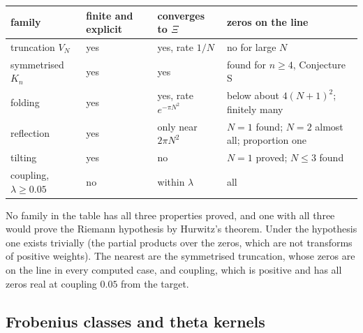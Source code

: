 \begin{center}
\small
\begin{tabular}{p{2.3cm}p{1.9cm}p{2.7cm}p{3.5cm}}
\hline
family & finite and explicit & converges to $\Xi$ & zeros on the line\\
\hline
truncation $V_N$ & yes & yes, rate $1/N$ & no for large $N$\\
symmetrised $K_n$ & yes & yes & found for $n\ge4$, Conjecture S\\
folding & yes & yes, rate $e^{-\pi N^2}$ & below about $4(N+1)^2$; finitely many\\
reflection & yes & only near $2\pi N^2$ & $N=1$ found; $N=2$ almost all; proportion one\\
tilting & yes & no & $N=1$ proved; $N\le3$ found\\
coupling, $\lambda\ge0.05$ & no & within $\lambda$ & all\\
\hline
\end{tabular}
\end{center}
No family in the table has all three properties proved, and one with all three would prove the Riemann hypothesis by Hurwitz's theorem. Under the hypothesis one exists trivially (the partial products over the zeros, which are not transforms of positive weights). The nearest are the symmetrised truncation, whose zeros are on the line in every computed case, and coupling, which is positive and has all zeros real at coupling $0.05$ from the target.

\subsection{Frobenius classes and theta kernels}\label{lxi:sub:frob}

